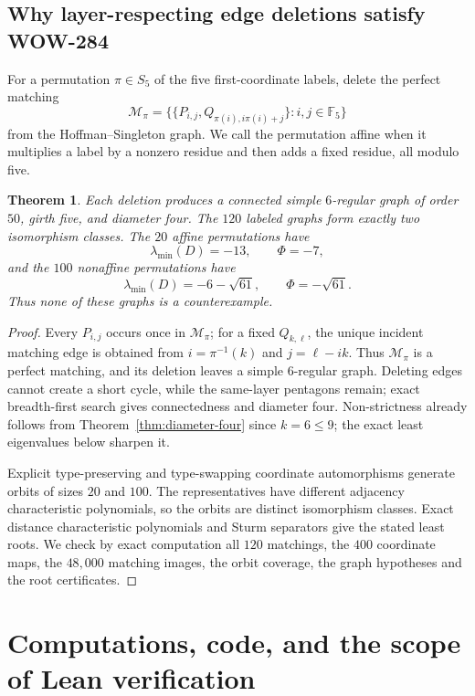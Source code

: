 \documentclass[a4paper,10pt,reqno]{amsart}
\theoremstyle{plain}
\newtheorem{theorem}{Theorem}[section]
\theoremstyle{definition}
\theoremstyle{remark}
\newcommand{\F}{\mathbb F_5}
\begin{document}
\subsection{Why layer-respecting edge deletions satisfy WOW-284}

For a permutation \(\pi\in S_5\) of the five first-coordinate labels,
delete the perfect matching
\[
 \mathcal M_\pi=\bigl\{\{P_{i,j},Q_{\pi(i),i\pi(i)+j}\}:i,j\in\F\bigr\}
\]
from the Hoffman--Singleton graph.
We call the permutation affine when it multiplies a label by a nonzero
residue and then adds a fixed residue, all modulo five.

\begin{theorem}\label{thm:matching-deletions}
Each deletion produces a connected simple \(6\)-regular graph of order
\(50\), girth five, and diameter four.  The \(120\) labeled graphs form
exactly two isomorphism classes.  The \(20\) affine permutations have
\[
 \lambda_{\min}(D)=-13,
 \qquad \Phi=-7,
\]
and the \(100\) nonaffine permutations have
\[
 \lambda_{\min}(D)=-6-\sqrt{61},
 \qquad \Phi=-\sqrt{61}.
\]
Thus none of these graphs is a counterexample.
\end{theorem}

\begin{proof}
Every \(P_{i,j}\) occurs once in \(\mathcal M_\pi\); for a fixed
\(Q_{k,\ell}\), the unique incident matching edge is obtained from
\(i=\pi^{-1}(k)\) and \(j=\ell-ik\).  Thus \(\mathcal M_\pi\) is a
perfect matching, and its deletion leaves a simple \(6\)-regular graph.
Deleting edges cannot create a short cycle, while the same-layer pentagons
remain; exact breadth-first search gives connectedness and diameter four.
Non-strictness already follows from Theorem~\ref{thm:diameter-four} since
\(k=6\le9\); the exact least eigenvalues below sharpen it.

Explicit type-preserving and type-swapping coordinate automorphisms generate
orbits of sizes \(20\) and \(100\).  The representatives have different
adjacency characteristic polynomials, so the orbits are distinct isomorphism
classes.  Exact distance characteristic polynomials and Sturm separators give
the stated least roots.  We check by exact computation all \(120\)
matchings, the \(400\) coordinate maps, the \(48{,}000\) matching images,
the orbit coverage, the graph hypotheses and the root certificates.
\end{proof}

\section{Computations, code, and the scope of Lean verification}\label{sec:verification}
\end{document}
